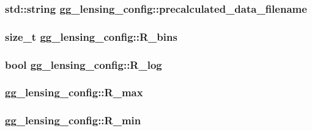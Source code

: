 \hypertarget{structgg__lensing__config_a8bc252029c599446dfbba897920eca0f}{
\subsubsection[{precalculated\-\_\-data\-\_\-filename}]{\setlength{\rightskip}{0pt plus 5cm}std\-::string gg\-\_\-lensing\-\_\-config\-::precalculated\-\_\-data\-\_\-filename}}\label{structgg__lensing__config_a8bc252029c599446dfbba897920eca0f}
\hypertarget{structgg__lensing__config_a0222122d7470e67e7aeb52096fcb6f90}{
\subsubsection[{R\-\_\-bins}]{\setlength{\rightskip}{0pt plus 5cm}size\-\_\-t gg\-\_\-lensing\-\_\-config\-::\-R\-\_\-bins}}\label{structgg__lensing__config_a0222122d7470e67e7aeb52096fcb6f90}
\hypertarget{structgg__lensing__config_a4ca415b5664d589eadea71166aaba4bc}{
\subsubsection[{R\-\_\-log}]{\setlength{\rightskip}{0pt plus 5cm}bool gg\-\_\-lensing\-\_\-config\-::\-R\-\_\-log}}\label{structgg__lensing__config_a4ca415b5664d589eadea71166aaba4bc}
\hypertarget{structgg__lensing__config_a18e40e60fa8b0f06e7550eb3c0411a8b}{
\subsubsection[{R\-\_\-max}]{ gg\-\_\-lensing\-\_\-config\-::\-R\-\_\-max}}\label{structgg__lensing__config_a18e40e60fa8b0f06e7550eb3c0411a8b}
\hypertarget{structgg__lensing__config_a14445ac28a5b6e168d407b5a862fa186}{
\subsubsection[{R\-\_\-min}]{ gg\-\_\-lensing\-\_\-config\-::\-R\-\_\-min}}\label{structgg__lensing__config_a14445ac28a5b6e168d407b5a862fa186}
